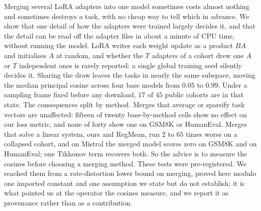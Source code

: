 Merging several LoRA adapters into one model sometimes costs almost
nothing and sometimes destroys a task, with no cheap way to tell which in
advance. We show that one detail of how the adapters were trained largely
decides it, and that the detail can be read off the adapter files in about
a minute of CPU time, without running the model. LoRA writes each weight
update as a product $BA$ and initialises $A$ at random, and whether the
$T$ adapters of a cohort drew one $A$ or $T$ independent ones is rarely
reported: a single global training seed silently decides it. Sharing the
draw leaves the tasks in nearly the same subspace, moving the median
principal cosine across four base models from $0.05$ to $0.99$. Under a
sampling frame fixed before any download, $17$ of $45$ public cohorts are
in that state. The consequences split by method. Merges that average or
sparsify task vectors are unaffected: fifteen of twenty base-by-method
cells show no effect on our loss metric, and none of forty show one on
GSM8K or HumanEval. Merges that solve a linear system,
ours and RegMean, run $2$ to $65$ times worse on a collapsed cohort, and
on Mistral the merged model scores zero on GSM8K and on HumanEval; one
Tikhonov term recovers both. So the advice is to measure the cosines
before choosing a merging method. These tests were pre-registered. We
reached them from a rate-distortion lower bound on merging, proved here
modulo one imported constant and one assumption we state but do not
establish; it is what pointed us at the operator the cosines measure,
and we report it as provenance rather than as a contribution.
